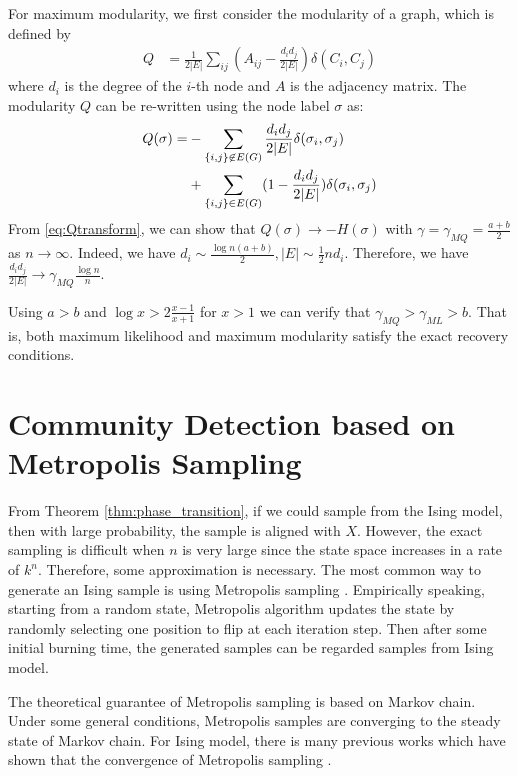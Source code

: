 \documentclass[journal]{IEEEtran}
\newcommand{\1}{\mathbbm{1}}
\begin{document}
For maximum modularity, we first consider the modularity of a graph, which is defined by
\begin{align}\label{eq:Q}
Q &= \frac{1}{2 |E|} \sum_{ij} (A_{ij} - \frac{d_i d_j}{2 |E|}) \delta(C_i, C_j)
\end{align}
where $d_i$ is the degree of the $i$-th node and $A$ is the adjacency matrix.
The modularity $Q$ can be re-written using the node label $\sigma$ as:
\begin{align}
Q(\sigma) = &-\sum_{\{i,j\} \not\in E(G) } \frac{d_i d_j}{2 |E|}\delta(\sigma_i,\sigma_j) \notag \\
&+ \sum_{\{i,j\} \in E(G) } (1 - \frac{d_i d_j}{2 |E|}) \delta(\sigma_i,\sigma_j)  \label{eq:Qtransform}
\end{align}
From \eqref{eq:Qtransform}, we can show that $Q(\sigma) \to -H(\sigma)$ with $\gamma = \gamma_{MQ} = \frac{a+b}{2}$ as $n\to \infty$.
Indeed, we have $d_i \sim \frac{\log n(a+b)}{2}, |E| \sim \frac{1}{2}n d_i$. Therefore, we have $\frac{d_id_j}{2|E|} \to \gamma_{MQ} \frac{\log n}{n} $.

Using $a>b$ and $\log x > 2 \frac{x-1}{x+1}$ for $x>1$ we can verify that $\gamma_{MQ} > \gamma_{ML} > b$. That is, both maximum likelihood and maximum modularity satisfy the exact recovery conditions.


\section{Community Detection based on Metropolis Sampling}\label{sec:ms}
From Theorem \ref{thm:phase_transition}, if we could sample from the Ising model, then with large probability, the sample
is aligned with $X$. However, the exact sampling is difficult when $n$ is very large since the state space increases in
a rate of $k^n$. Therefore, some approximation is
necessary. The most common way to generate an Ising sample is using Metropolis sampling \cite{metropolis1953equation}. 
Empirically speaking, starting from a random state, Metropolis algorithm updates the state by randomly selecting one position to flip at each iteration step.
Then after some initial burning time, the generated samples can be regarded samples from Ising model.

The theoretical guarantee of Metropolis sampling is based on Markov chain. Under some general conditions, Metropolis samples are converging to
the steady state of Markov chain. For Ising model, there is many previous works which have shown that
the convergence of Metropolis sampling \cite{diaconis1998we}.
\end{document}

